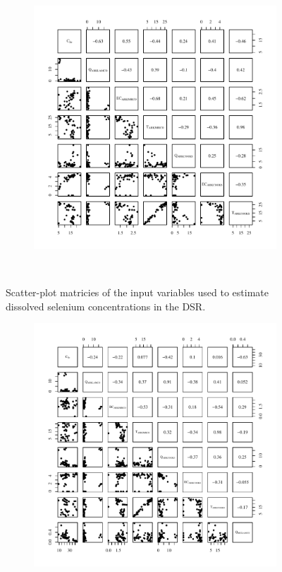 \begin{linenumbers}
\begin{landscape}
\begin{figure}
\begin{subfigure}{0.7\textwidth}
			\centering			
			\includegraphics[width=\tableCustomSize]{"Figures/Results_DSR/Stochastic/Conc Model Full PairsD106C"}
		\end{subfigure}\\
		\caption{Scatter-plot matricies of the input variables used to estimate dissolved selenium concentrations in the DSR.}
	\end{figure}
\end{landscape}
\subfiguremid
\begin{landscape}
	\begin{figure}
		\begin{subfigure}{0.7\textwidth}
			\centering
			\includegraphics[width=\tableCustomSize]{"Figures/Results_DSR/Stochastic/Conc Model Full PairsBIG"}

\end{subfigure}
\end{figure}
\end{landscape}
\end{linenumbers}
